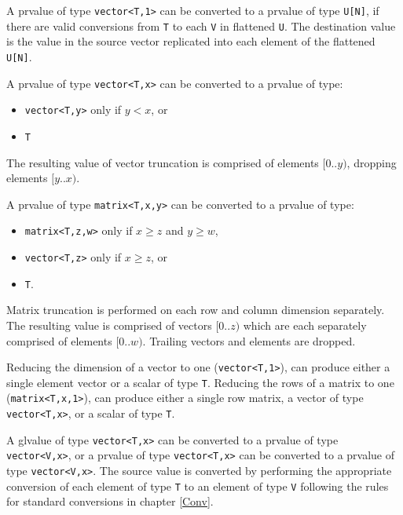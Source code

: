 \p A prvalue of type \texttt{vector<T,1>} can be converted to a
prvalue of type \texttt{U[N]}, if there are valid conversions from
\texttt{T} to each \texttt{V} in flattened \texttt{U}. The destination value
is the value in the source vector replicated into each element of the flattened
\texttt{U[N]}.


\p A prvalue of type \texttt{vector<T,x>} can be converted to a prvalue of type:
\begin{itemize}
\item \texttt{vector<T,y>} only if \( y < x \), or
\item \texttt{T}
\end{itemize}

\p The resulting value of vector truncation is comprised of elements \( [0..y)
\), dropping elements \( [y..x) \).

\p A prvalue of type \texttt{matrix<T,x,y>} can be converted to a prvalue of
type:
\begin{itemize}
  \item \texttt{matrix<T,z,w>} only if \( x \geq z \) and \(y \geq w \),
  \item \texttt{vector<T,z>} only if \( x \geq z \), or
  \item \texttt{T}.
\end{itemize}

\p Matrix truncation is performed on each row and column dimension separately.
The resulting value is comprised of vectors \( [0..z) \) which are each
separately comprised of elements \( [0..w) \). Trailing vectors and elements are
dropped.

\p Reducing the dimension of a vector to one (\texttt{vector<T,1>}), can produce
either a single element vector or a scalar of type \texttt{T}. Reducing the
rows of a matrix to one (\texttt{matrix<T,x,1>}), can produce either a single
row matrix, a vector of type \texttt{vector<T,x>}, or a scalar of type
\texttt{T}.


\p A glvalue of type \texttt{vector<T,x>} can be converted to a prvalue of type
\texttt{vector<V,x>}, or a prvalue of type \texttt{vector<T,x>} can be converted
to a prvalue of type \texttt{vector<V,x>}. The source value is converted by
performing the appropriate conversion of each element of type \texttt{T} to an
element of type \texttt{V} following the rules for standard conversions
in chapter \ref{Conv}.

